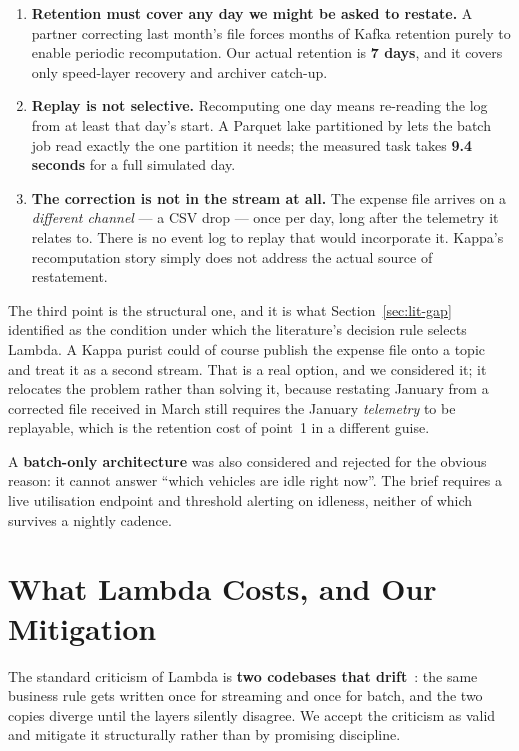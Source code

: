 \begin{enumerate}
  \item \textbf{Retention must cover any day we might be asked to
        restate.} A partner correcting last month's file forces months of
        Kafka retention purely to enable periodic recomputation. Our
        actual retention is \textbf{7 days}, and it covers only
        speed-layer recovery and archiver catch-up.
  \item \textbf{Replay is not selective.} Recomputing one day means
        re-reading the log from at least that day's start. A Parquet lake
        partitioned by  lets the batch job read exactly
        the one partition it needs; the measured
         task takes \textbf{9.4 seconds} for
        a full simulated day.
  \item \textbf{The correction is not in the stream at all.} The expense
        file arrives on a \emph{different channel} --- a CSV drop --- once
        per day, long after the telemetry it relates to. There is no
        event log to replay that would incorporate it. Kappa's
        recomputation story simply does not address the actual source of
        restatement.
\end{enumerate}

The third point is the structural one, and it is what
Section~\ref{sec:lit-gap} identified as the condition under which the
literature's decision rule selects Lambda. A Kappa purist could of course
publish the expense file onto a topic and treat it as a second stream.
That is a real option, and we considered it; it relocates the problem
rather than solving it, because restating January from a corrected file
received in March still requires the January \emph{telemetry} to be
replayable, which is the retention cost of point~1 in a different guise.

A \textbf{batch-only architecture} was also considered and rejected for
the obvious reason: it cannot answer ``which vehicles are idle right
now''. The brief requires a live utilisation endpoint and threshold
alerting on idleness, neither of which survives a nightly cadence.

\section{What Lambda Costs, and Our Mitigation}
\label{sec:lambda-cost}

The standard criticism of Lambda is \textbf{two codebases that
drift}~\cite{kreps2014questioning}: the same business rule gets written
once for streaming and once for batch, and the two copies diverge until
the layers silently disagree. We accept the criticism as valid and
mitigate it structurally rather than by promising discipline.


